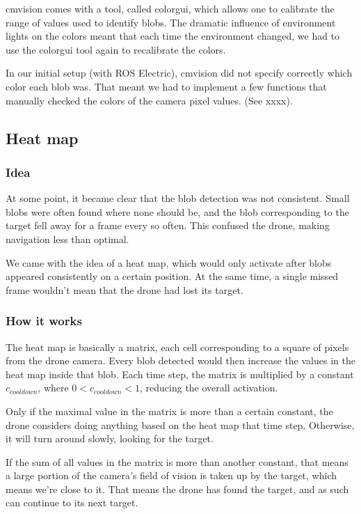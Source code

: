 \documentclass[a4paper,10pt]{article}
\begin{document}
cmvision comes with a tool, called colorgui, which allows one to calibrate the
range of values used to identify blobs. The dramatic influence of environment
lights on the colors meant that each time the environment changed, we had to
use the colorgui tool again to recalibrate the colors.

In our initial setup (with ROS Electric), cmvision did not specify correctly
which color each blob was. That meant we had to implement a few functions that
manually checked the colors of the camera pixel values. (See xxxx).


\subsection{Heat map}
\subsubsection{Idea}
At some point, it became clear that the blob detection was not consistent.
Small blobs were often found where none should be, and the blob corresponding
to the target fell away for a frame every so often. This confused the drone,
making navigation less than optimal.

We came with the idea of a heat map, which
would only activate after blobs appeared consistently on a certain position.
At the same time, a single missed frame wouldn't mean that the drone had lost
its target.
\subsubsection{How it works}\label{subsec:howheatmapworks}
The heat map is basically a matrix, each cell corresponding to a square of
pixels from the drone camera. Every blob detected would then increase the
values in the heat map inside that blob. Each time step, the matrix is
multiplied by a constant $c_{{cooldown}}$, where
$0 < c_{{cooldown}} < 1$, reducing the overall
activation.

Only if the maximal value in the matrix is more than a certain constant,
the drone considers doing anything based on the heat map that time step.
Otherwise, it will turn around slowly, looking for the target.

If the sum of all values in the matrix is more than another constant,
that means a large portion of the camera's field of vision is taken up
by the target, which means we're close to it. That means the drone has
found the target, and as such can continue to its next target.
\end{document}
